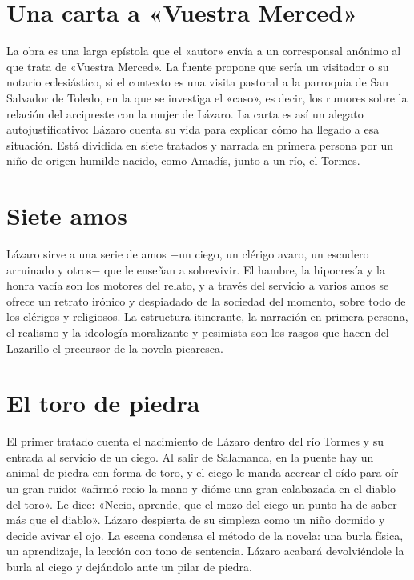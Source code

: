 \documentclass{book}
\begin{document}

\section{Una carta a «Vuestra Merced»}

La obra es una larga epístola que el «autor» envía a un corresponsal anónimo al que trata de «Vuestra Merced». La fuente propone que sería un visitador o su notario eclesiástico, si el contexto es una visita pastoral a la parroquia de San Salvador de Toledo, en la que se investiga el «caso», es decir, los rumores sobre la relación del arcipreste con la mujer de Lázaro. La carta es así un alegato autojustificativo: Lázaro cuenta su vida para explicar cómo ha llegado a esa situación. Está dividida en siete tratados y narrada en primera persona por un niño de origen humilde nacido, como Amadís, junto a un río, el Tormes.


\section{Siete amos}

Lázaro sirve a una serie de amos \(-\)un ciego, un clérigo avaro, un escudero arruinado y otros\(-\) que le enseñan a sobrevivir. El hambre, la hipocresía y la honra vacía son los motores del relato, y a través del servicio a varios amos se ofrece un retrato irónico y despiadado de la sociedad del momento, sobre todo de los clérigos y religiosos. La estructura itinerante, la narración en primera persona, el realismo y la ideología moralizante y pesimista son los rasgos que hacen del Lazarillo el precursor de la novela picaresca.


\section{El toro de piedra}

El primer tratado cuenta el nacimiento de Lázaro dentro del río Tormes y su entrada al servicio de un ciego. Al salir de Salamanca, en la puente hay un animal de piedra con forma de toro, y el ciego le manda acercar el oído para oír un gran ruido: «afirmó recio la mano y dióme una gran calabazada en el diablo del toro». Le dice: «Necio, aprende, que el mozo del ciego un punto ha de saber más que el diablo». Lázaro despierta de su simpleza como un niño dormido y decide avivar el ojo. La escena condensa el método de la novela: una burla física, un aprendizaje, la lección con tono de sentencia. Lázaro acabará devolviéndole la burla al ciego y dejándolo ante un pilar de piedra.
\end{document}
